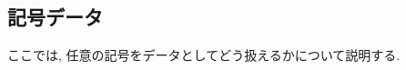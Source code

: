 \setcounter{section}{2}
\setcounter{subsection}{2}
%
\subsection{記号データ}
ここでは, 任意の記号をデータとしてどう扱えるかについて説明する.
%

%

